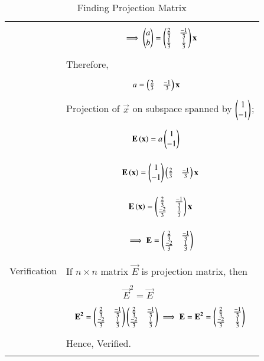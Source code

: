 \documentclass[journal,12pt]{IEEEtran}
\begin{document}
\begin{longtable}{|p{4cm}|p{14cm}|}
       
       
       &
       {\begin{align}
       \implies \begin{pmatrix}a\\b\end{pmatrix} = \begin{pmatrix}\frac{2}{3}&\frac{-1}{3}\\\frac{1}{3}&\frac{1}{3}\end{pmatrix}\mathbf{x}
       \end{align}}\\
       & Therefore,\\
       &{\begin{align}
           a &=\begin{pmatrix}\frac{2}{3}&\frac{-1}{3}\end{pmatrix}\mathbf{x}
       \end{align}}\\
       
     & Projection of $\vec{x}$ on subspace spanned by $\begin{pmatrix}1\\-1\end{pmatrix}$;\\
     &
     {\begin{align}
     & \mathbf{E}\left(\mathbf{x}\right) = a\begin{pmatrix}1\\-1\end{pmatrix}
     \end{align}}\\
     &
     {\begin{align}
       \mathbf{E}\left(\mathbf{x}\right) = \begin{pmatrix}1\\-1\end{pmatrix}\begin{pmatrix}\frac{2}{3}& \frac{-1}{3}\end{pmatrix}\mathbf{x}
       \end{align}}\\
       &{\begin{align}
     \mathbf{E}\left(\mathbf{x}\right) = \begin{pmatrix}\frac{2}{3}&\frac{-1}{3}\\\frac{-2}{3}&\frac{1}{3}\end{pmatrix}\mathbf{x}
      \end{align}}\\
      &{\begin{align}
      \implies{ \mathbf{E}= \ensuremath{\begin{pmatrix}\frac{2}{3}&\frac{-1}{3}\\\frac{-2}{3}& \frac{1}{3}\end{pmatrix}}}
      \end{align}}\\
       \hline
       \multirow{3}{*}{Verification} & \\
& If $n\times n$ matrix $\vec{E}$ is projection matrix, then\\
	&\\
	&$\qquad\qquad\qquad \vec{E}^2=\vec{E}$\\
  &{\begin{align}
  \mathbf{E^{2}} = \begin{pmatrix}\frac{2}{3}&\frac{-1}{3}\\\frac{-2}{3}& \frac{1}{3}\end{pmatrix}\begin{pmatrix}\frac{2}{3}&\frac{-1}{3}\\\frac{-2}{3}& \frac{1}{3}\end{pmatrix}
  \implies \mathbf{E}=\mathbf{E^{2}}=\begin{pmatrix}\frac{2}{3}&\frac{-1}{3}\\\frac{-2}{3}& \frac{1}{3}\end{pmatrix}
  \end{align}}\\
  & Hence, Verified.\\
  \hline
\caption{Finding Projection Matrix}
\label{table:1}	
\end{longtable}
\end{document}
